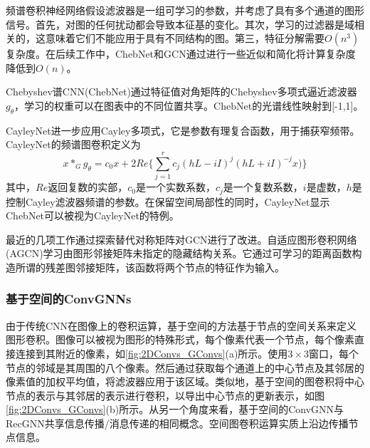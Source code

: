 频谱卷积神经网络假设滤波器是一组可学习的参数，并考虑了具有多个通道的图形信号。首先，对图的任何扰动都会导致本征基的变化。其次，学习的过滤器是域相关的，这意味着它们不能应用于具有不同结构的图。第三，特征分解需要$O(n^3)$复杂度。在后续工作中，ChebNet和GCN通过进行一些近似和简化将计算复杂度降低到$O(n)$。

Chebyshev谱CNN(ChebNet)通过特征值对角矩阵的Chebyshev多项式逼近滤波器$g_{\theta}$，学习的权重可以在图表中的不同位置共享。ChebNet的光谱线性映射到[-1,1]。

CayleyNet进一步应用Cayley多项式，它是参数有理复合函数，用于捕获窄频带。CayleyNet的频谱图卷积定义为
\[
x*_Gg_{\theta}=c_0x+2Re\{\sum_{j=1}^{r}c_j(hL-iI)^j(hL+iI)^{-j}x)\}
\]
其中，$Re$返回复数的实部，$c_0$是一个实数系数，$c_j$是一个复数系数，$i$是虚数，$h$是控制Cayley滤波器频谱的参数。在保留空间局部性的同时，CayleyNet显示ChebNet可以被视为CayleyNet的特例。

  
最近的几项工作通过探索替代对称矩阵对GCN进行了改进。自适应图形卷积网络(AGCN)学习由图形邻接矩阵未指定的隐藏结构关系。它通过可学习的距离函数构造所谓的残差图邻接矩阵，该函数将两个节点的特征作为输入。

\subsubsection{基于空间的ConvGNNs}
由于传统CNN在图像上的卷积运算，基于空间的方法基于节点的空间关系来定义图形卷积。图像可以被视为图形的特殊形式，每个像素代表一个节点，每个像素直接连接到其附近的像素，如\ref{fig:2DConvs_GConvs}(a)所示。使用$3\times 3$窗口，每个节点的邻域是其周围的八个像素。然后通过获取每个通道上的中心节点及其邻居的像素值的加权平均值，将滤波器应用于该区域。类似地，基于空间的图卷积将中心节点的表示与其邻居的表示进行卷积，以导出中心节点的更新表示，如图\ref{fig:2DConvs_GConvs}(b)所示。从另一个角度来看，基于空间的ConvGNN与RecGNN共享信息传播/消息传递的相同概念。空间图卷积运算实质上沿边传播节点信息。

